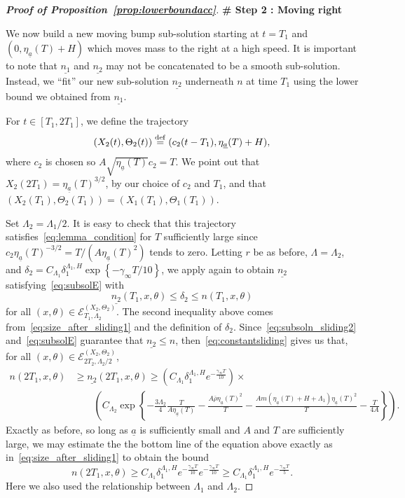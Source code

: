 \documentclass[11pt]{article}    %
\begin{document}
\begin{proof}[{\bf Proof of Proposition~\ref{prop:lowerboundacc}}]
\smallskip

{\bf \# Step 2 : Moving right}

\smallskip

We now build a new moving bump sub-solution starting at $t = T_1$ and $(0,\eta_{\underline a}(T) + H)$ which moves mass to the right at a high speed.  It is important to note that $\underline{n_1}$ and $\underline{n_2}$ may not be concatenated to be a smooth sub-solution.  Instead, we ``fit'' our new sub-solution $\underline{n_2}$ underneath $n$ at time $T_1$ using the lower bound we obtained from $\underline{n_1}$.

For $t\in[T_1, 2T_1]$, we define the trajectory
\[
	(X_2(t), \Theta_2(t)) \stackrel{\rm def}{=} (c_2 (t-T_1), \eta_{\underline a}(T) + H),
\]
where $c_2$ is chosen so $A \sqrt{\eta_{\underline a}(T)} c_2 = T$.  We point out that $X_2(2T_1) = \eta_{\underline a}(T)^{3/2}$, by our choice of $c_2$ and $T_1$, and that $(X_2(T_1), \Theta_2(T_1)) = (X_1(T_1), \Theta_1(T_1))$.

Set $\Lambda_2 = \Lambda_1/2$.  It is easy to check that this trajectory satisfies~\eqref{eq:lemma_condition} for $T$ sufficiently large since $c_2 \eta_{\underline a}(T)^{-3/2} = T/ (A \eta_{\underline a}(T)^2)$ tends to zero.  Letting $r$ be as before, $\Lambda = \Lambda_2$, and $\delta_2 = C_{\Lambda_1} \delta_1^{\Lambda_1,H} \exp\left\{ - \gamma_\infty T/10\right\}$, we apply  again to obtain $\underline{n_2}$ satisfying~\eqref{eq:subsolE} with
\begin{equation}\label{eq:subsoln_sliding2}
	\underline{n_2}(T_1,x,\theta) \leq \delta_2 \leq n(T_1,x,\theta)
\end{equation}
for all $(x,\theta) \in \mathcal{E}_{T_1,\Lambda_2}^{(X_2,\Theta_2)}$.  The second inequality above comes from~\eqref{eq:size_after_sliding1} and the definition of $\delta_2$.  Since~\eqref{eq:subsoln_sliding2} and~\eqref{eq:subsolE} guarantee that $\underline{n_2} \leq n$, then~\eqref{eq:constantsliding} gives us that, for all $(x,\theta) \in \mathcal{E}_{2T_2,\Lambda_2/2}^{(X_2,\Theta_2)}$,
\[\begin{split}
	n(2T_1, x,\theta)
		&\geq \underline{n_2}(2T_1,x,\theta)
		\geq \left(C_{\Lambda_1} \delta_1^{\Lambda_1,H} e^{- \frac{\gamma_\infty T}{10}}\right) \times \\
		&\qquad \left(C_{\Lambda_2} \exp\left\{ - \frac{3\Lambda_2}{4}\frac{T}{A\eta_{\underline a}(T)} - \frac{A \overline \rho \eta_{\underline a}(T)^2}{T} - \frac{A m(\eta_{\underline a}(T) + H + \Lambda_1) \eta_{\underline a}(T)^2}{T}- \frac{T}{4A} \right\}\right).
\end{split}\]
Exactly as before, so long as $\underline{a}$ is sufficiently small and $A$ and $T$ are sufficiently large, we may estimate the the bottom line of the equation above exactly as in~\eqref{eq:size_after_sliding1} to obtain the bound
\[
	n(2T_1, x,\theta)
		\geq C_{\Lambda_1} \delta_1^{\Lambda_1,H}  e^{- \frac{\gamma_\infty T}{10}}e^{- \frac{\gamma_\infty T}{10}}
		\geq C_{\Lambda_1} \delta_1^{\Lambda_1,H} e^{- \frac{\gamma_\infty T}{5}}.
\]
Here we also used the relationship between $\Lambda_1$ and $\Lambda_2$.



\end{proof}
\end{document}
